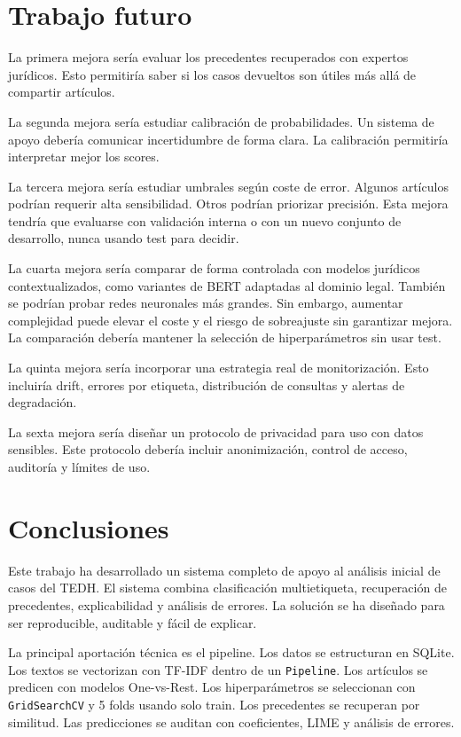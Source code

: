 \documentclass[11pt,a4paper]{article}
\begin{document}
\section{Trabajo futuro}
\label{sec_futuro}

La primera mejora sería evaluar los precedentes recuperados con expertos jurídicos. Esto permitiría saber si los casos devueltos son útiles más allá de compartir artículos.

La segunda mejora sería estudiar calibración de probabilidades. Un sistema de apoyo debería comunicar incertidumbre de forma clara. La calibración permitiría interpretar mejor los scores.

La tercera mejora sería estudiar umbrales según coste de error. Algunos artículos podrían requerir alta sensibilidad. Otros podrían priorizar precisión. Esta mejora tendría que evaluarse con validación interna o con un nuevo conjunto de desarrollo, nunca usando test para decidir.

La cuarta mejora sería comparar de forma controlada con modelos jurídicos contextualizados, como variantes de BERT adaptadas al dominio legal. También se podrían probar redes neuronales más grandes. Sin embargo, aumentar complejidad puede elevar el coste y el riesgo de sobreajuste sin garantizar mejora. La comparación debería mantener la selección de hiperparámetros sin usar test.

La quinta mejora sería incorporar una estrategia real de monitorización. Esto incluiría drift, errores por etiqueta, distribución de consultas y alertas de degradación.

La sexta mejora sería diseñar un protocolo de privacidad para uso con datos sensibles. Este protocolo debería incluir anonimización, control de acceso, auditoría y límites de uso.

\section{Conclusiones}
\label{sec_conclusiones}

Este trabajo ha desarrollado un sistema completo de apoyo al análisis inicial de casos del TEDH. El sistema combina clasificación multietiqueta, recuperación de precedentes, explicabilidad y análisis de errores. La solución se ha diseñado para ser reproducible, auditable y fácil de explicar.

La principal aportación técnica es el pipeline. Los datos se estructuran en SQLite. Los textos se vectorizan con TF-IDF dentro de un \texttt{Pipeline}. Los artículos se predicen con modelos One-vs-Rest. Los hiperparámetros se seleccionan con \texttt{GridSearchCV} y 5 folds usando solo train. Los precedentes se recuperan por similitud. Las predicciones se auditan con coeficientes, LIME y análisis de errores.
\end{document}
